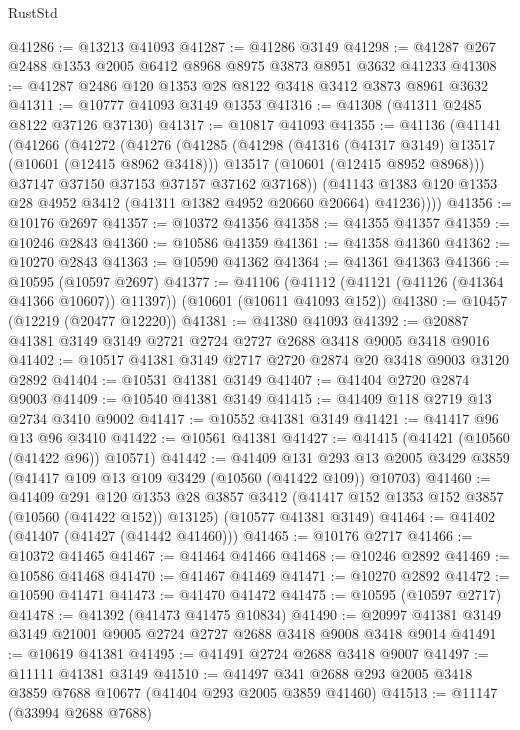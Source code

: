 \begin{lexlean}{RustStd}
\begin{coremodule}
@41286 := @13213 @41093
@41287 := @41286 @3149
@41298 := @41287 @267 @2488 @1353 @2005 @6412 @8968 @8975 @3873 @8951 @3632 @41233
@41308 := @41287 @2486 @120 @1353 @28 @8122 @3418 @3412 @3873 @8961 @3632
@41311 := @10777 @41093 @3149 @1353
@41316 := @41308 (@41311 @2485 @8122 @37126 @37130)
@41317 := @10817 @41093
@41355 := @41136
    (@41141
      (@41266
        (@41272
          (@41276
            (@41285
              (@41298
                (@41316 (@41317 @3149) @13517 (@10601 (@12415 @8962 @3418)))
                @13517
                (@10601 (@12415 @8952 @8968)))
              @37147
              @37150
              @37153
              @37157
              @37162
              @37168))
          (@41143 @1383 @120 @1353 @28 @4952 @3412 (@41311 @1382 @4952 @20660 @20664) @41236))))
@41356 := @10176 @2697
@41357 := @10372 @41356
@41358 := @41355 @41357
@41359 := @10246 @2843
@41360 := @10586 @41359
@41361 := @41358 @41360
@41362 := @10270 @2843
@41363 := @10590 @41362
@41364 := @41361 @41363
@41366 := @10595 (@10597 @2697)
@41377 := @41106
    (@41112 (@41121 (@41126 (@41364 @41366 @10607)) @11397))
    (@10601 (@10611 @41093 @152))
@41380 := @10457 (@12219 (@20477 @12220))
@41381 := @41380 @41093
@41392 := @20887 @41381 @3149 @3149 @2721 @2724 @2727 @2688 @3418 @9005 @3418 @9016
@41402 := @10517 @41381 @3149 @2717 @2720 @2874 @20 @3418 @9003 @3120 @2892
@41404 := @10531 @41381 @3149
@41407 := @41404 @2720 @2874 @9003
@41409 := @10540 @41381 @3149
@41415 := @41409 @118 @2719 @13 @2734 @3410 @9002
@41417 := @10552 @41381 @3149
@41421 := @41417 @96 @13 @96 @3410
@41422 := @10561 @41381
@41427 := @41415 (@41421 (@10560 (@41422 @96)) @10571)
@41442 := @41409
    @131
    @293
    @13
    @2005
    @3429
    @3859
    (@41417 @109 @13 @109 @3429 (@10560 (@41422 @109)) @10703)
@41460 := @41409
    @291
    @120
    @1353
    @28
    @3857
    @3412
    (@41417 @152 @1353 @152 @3857 (@10560 (@41422 @152)) @13125)
    (@10577 @41381 @3149)
@41464 := @41402 (@41407 (@41427 (@41442 @41460)))
@41465 := @10176 @2717
@41466 := @10372 @41465
@41467 := @41464 @41466
@41468 := @10246 @2892
@41469 := @10586 @41468
@41470 := @41467 @41469
@41471 := @10270 @2892
@41472 := @10590 @41471
@41473 := @41470 @41472
@41475 := @10595 (@10597 @2717)
@41478 := @41392 (@41473 @41475 @10834)
@41490 := @20997 @41381 @3149 @3149 @21001 @9005 @2724 @2727 @2688 @3418 @9008 @3418 @9014
@41491 := @10619 @41381
@41495 := @41491 @2724 @2688 @3418 @9007
@41497 := @11111 @41381 @3149
@41510 := @41497 @341 @2688 @293 @2005 @3418 @3859 @7688 @10677 (@41404 @293 @2005 @3859 @41460)
@41513 := @11147 (@33994 @2688 @7688)

\end{coremodule}
\end{lexlean}
